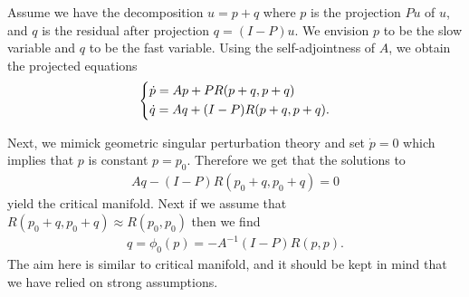 Assume we have the decomposition $u=p+q$ where $p$ is the projection $Pu$ of $u$, and $q$ is the residual after projection $q=(I-P)u$. We envision $p$ to be the slow variable and $q$ to be the fast variable. Using the self-adjointness of $A$, we obtain the projected equations
\begin{align}
	\begin{dcases}
		\dot{p} = Ap + PR(p+q, p+q) \\
		\dot{q} = Aq + (I-P)R(p+q, p+q).
	\end{dcases}
\end{align}

Next, we mimick geometric singular perturbation theory and set $\dot{p}=0$ which implies that $p$ is constant $p=p_0$. Therefore we get that the solutions to
\begin{align}
	Aq - (I-P)R(p_0 + q, p_0 +q) =0
\end{align}
yield the critical manifold. Next if we assume that $R(p_{0}+q, p_{0}+q) \approx R(p_0, p_0)$ then we find
\begin{align}
	q = \phi_0(p) = - A^{-1}(I-P)R(p,p).
\end{align}
The aim here is similar to critical manifold, and it should be kept in mind that we have relied on strong assumptions.

